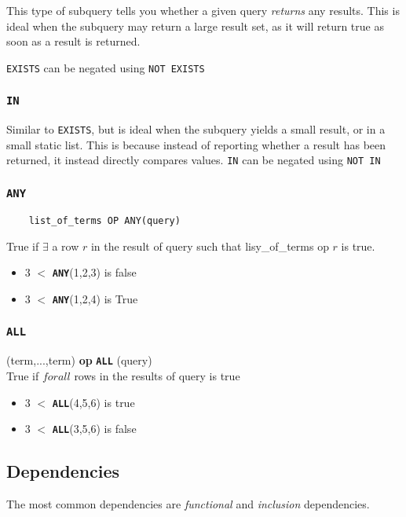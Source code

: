 \documentclass{article}
\begin{document}
This type of subquery tells you whether a given query \textit{returns} any results. This is ideal when the subquery may return a large result set, as it will return true as soon as a result is returned.

\texttt{EXISTS} can be negated using \texttt{NOT EXISTS}

\subsubsection*{\texttt{IN}}

Similar to \texttt{EXISTS}, but is ideal when the subquery yields a small result, or in a small static list. This is because instead of reporting whether a result has been returned, it instead directly compares values.
\texttt{IN} can be negated using \texttt{NOT IN}

\subsubsection*{\texttt{ANY}}
\begin{lstlisting}
    list_of_terms OP ANY(query)
  \end{lstlisting}
True if $\exists$ a row $r$ in the result of query such that lisy\_of\_terms op $r$ is true.
\begin{itemize}
  \item 3 $<$ \texttt{\textbf{ANY}}({1,2,3}) is false
  \item 3 $<$ \texttt{\textbf{ANY}}({1,2,4}) is True
\end{itemize}

\subsubsection*{\texttt{ALL}}
(term,...,term) \textbf{op} \texttt{\textbf{ALL}} (query)\\
True if $forall$ rows in the results of query is true
\begin{itemize}
  \item 3 $<$ \texttt{\textbf{ALL}}(4,5,6) is true
  \item 3 $<$ \texttt{\textbf{ALL}}(3,5,6) is false
\end{itemize}

\subsection{Dependencies}

The most common dependencies are \textit{functional} and \textit{inclusion} dependencies.
\end{document}
